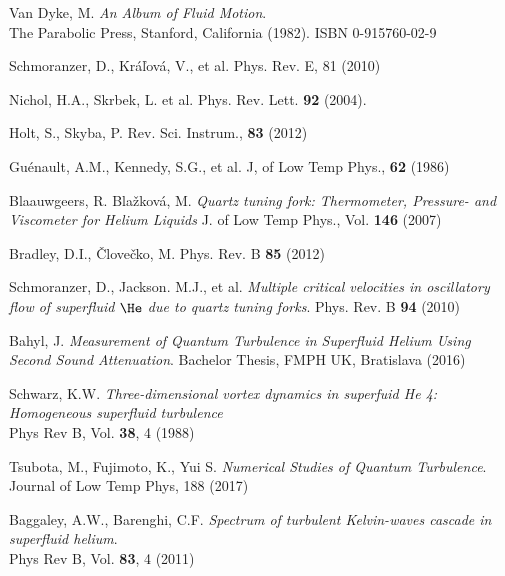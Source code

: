 \begin{thebibliography}{99}
	{\sc Van Dyke, M.}
	\emph{An Album of Fluid Motion}.\\
	The Parabolic Press, Stanford, California (1982). ISBN 0-915760-02-9

	{\sc Schmoranzer, D., Kráľová, V., et al.}
	\emph{}	Phys. Rev. E, 81 (2010)

	{\sc Nichol, H.A., Skrbek, L. et al.}
	\emph{} Phys. Rev. Lett. \textbf{92} (2004).


	{\sc Holt, S., Skyba, P.}
	\emph{} Rev. Sci. Instrum., \textbf{83} (2012)

	{\sc Guénault, A.M., Kennedy, S.G., et al.}
	\emph{} J, of Low Temp Phys., \textbf{62} (1986)

	{\sc Blaauwgeers, R. Blažková, M.} 
	\emph{Quartz tuning fork: Thermometer, Pressure- and Viscometer for Helium Liquids} J. of Low Temp Phys., Vol. \textbf{146} (2007)

	{\sc Bradley, D.I., Človečko, M.} 
	\emph{} Phys. Rev. B \textbf{85} (2012)

	{\sc Schmoranzer, D., Jackson. M.J., et al.}
	\emph{Multiple critical velocities in oscillatory flow of superfluid $\He$ due to quartz tuning forks}.
	Phys. Rev. B \textbf{94} (2010)

	{\sc Bahyl, J.}
	\emph{Measurement of Quantum Turbulence in Superfluid Helium Using Second Sound Attenuation}.
	Bachelor Thesis, FMPH UK, Bratislava (2016)


	{\sc Schwarz, K.W.}
	\emph{Three-dimensional vortex dynamics in superfuid He 4: Homogeneous superfluid turbulence}\\
	Phys Rev B, Vol. \textbf{38}, 4 (1988)

	{\sc Tsubota, M., Fujimoto, K., Yui S.}
	\emph{Numerical Studies of Quantum Turbulence}.\\
	Journal of Low Temp Phys, 188 (2017)

	{\sc Baggaley, A.W., Barenghi, C.F.}
	\emph{Spectrum of turbulent Kelvin-waves cascade in superfluid helium}.\\
	Phys Rev B, Vol. \textbf{83}, 4 (2011)


\end{thebibliography}
